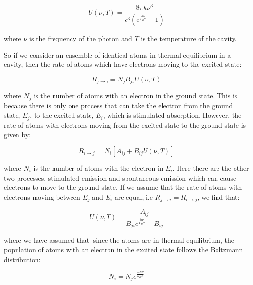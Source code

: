 \begin{equation}
    U(\nu, T) = \frac{8\pi h \nu^3}{c^3(e^{\frac{h\nu}{k_B T}} - 1)}
    \label{PlanckSpectralEnergyDensity}
\end{equation}

\noindent where $\nu$ is the frequency of the photon and $T$ is the temperature of the cavity.

\noindent So if we consider an ensemble of identical atoms in thermal equilibrium in a cavity, then the rate of atoms which have electrons moving to the excited state:

\begin{equation}
    R_{j \rightarrow i} = N_j B_{ji} U(\nu, T)
    \label{StimulatedAbsorptionAtoms}
\end{equation}

\noindent where $N_j$ is the number of atoms with an electron in the ground state. This is because there is only one process that can take the electron from the ground state, $E_j$, to the excited state, $E_i$, which is stimulated absorption. However, the rate of atoms with electrons moving from the excited state to the ground state is given by:

\begin{equation}
    R_{i \rightarrow j} = N_i[A_{ij} + B_{ij} U(\nu, T)]
    \label{StimulatedSpontaneousEmissionAtoms}
\end{equation}

\noindent where $N_i$ is the number of atoms with the electron in $E_i$. Here there are the other two processes, stimulated emission and spontaneous emission which can cause electrons to move to the ground state. If we assume that the rate of atoms with electrons moving between $E_j$ and $E_i$ are equal, i.e $R_{j \rightarrow i} = R_{i \rightarrow j}$, we find that:

\begin{equation}
    U(\nu, T) = \frac{A_{ij}}{B_{ji} e^{\frac{h \nu}{k_B T}} - B_{ij}}
    \label{SpectralEnergyDensityLaser}
\end{equation}

\noindent where we have assumed that, since the atoms are in thermal equilibrium, the population of atoms with an electron in the excited state follows the Boltzmann distribution:

\begin{equation}
    N_i = N_j e^{\frac{-h \nu}{k_B T}}
    \label{BoltzmannDistributionPopulationStates}
\end{equation}

